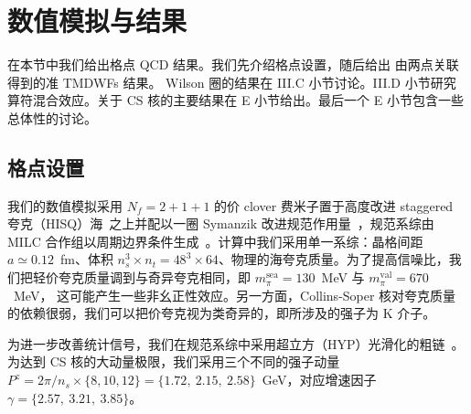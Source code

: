\section{数值模拟与结果}
\label{sec:numerics}

在本节中我们给出格点 QCD 结果。我们先介绍格点设置，随后给出
由两点关联得到的准 TMDWFs 结果。
Wilson 圈的结果在 III.C 小节讨论。III.D 小节研究算符混合效应。关于 CS 核的主要结果在 E 小节给出。最后一个 E 小节包含一些总体性的讨论。

\subsection{格点设置 }

我们的数值模拟采用 $N_f=2+1+1$ 的价 clover 费米子置于高度改进 staggered 夸克（HISQ）海~\cite{Follana:2006rc}之上并配以一圈 Symanzik 改进规范作用量~\cite{Symanzik:1983dc}，规范系综由 MILC 合作组以周期边界条件生成~\cite{MILC:2012znn}。计算中我们采用单一系综：晶格间距 $a\simeq0.12$~fm、体积 $n_s^3\times n_t=48^3\times64$、物理的海夸克质量。为了提高信噪比，我们把轻价夸克质量调到与奇异夸克相同，即 $m_{\pi}^{\mathrm{sea}}=130$~MeV 与 $m_{\pi}^{\mathrm{val}}=670$~MeV，
这可能产生一些非幺正性效应。另一方面，Collins-Soper 核对夸克质量的依赖很弱，我们可以把价夸克视为类奇异的，即所涉及的强子为 K 介子。

为进一步改善统计信号，我们在规范系综中采用超立方（HYP）光滑化的粗链~\cite{Hasenfratz:2001hp}。为达到 CS 核的大动量极限，我们采用三个不同的强子动量 $P^z=2\pi/n_s\times\{8,10,12\}=\{1.72,~2.15,~2.58\}$~GeV，对应增速因子 $\gamma=\{2.57,~3.21,~3.85\}$。


